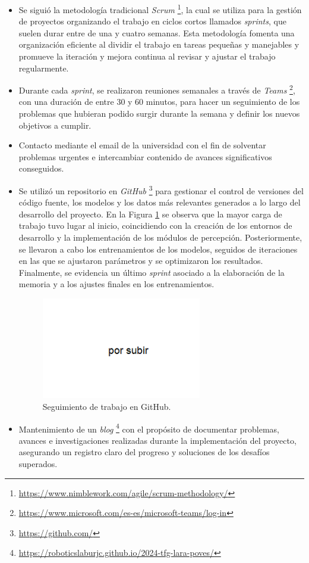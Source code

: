 \begin{itemize}
\item Se siguió la metodología tradicional \textit{Scrum} \footnote{\url{https://www.nimblework.com/agile/scrum-methodology/}}, la cual se utiliza para la gestión de proyectos organizando el trabajo en ciclos cortos llamados \textit{sprints}, que suelen durar entre de una y cuatro semanas. Esta metodología fomenta una organización eficiente al dividir el trabajo en tareas pequeñas y manejables y promueve la iteración y mejora continua al revisar y ajustar el trabajo regularmente.
\item Durante cada \textit{sprint}, se realizaron reuniones semanales a través de \textit{Teams} \footnote{\url{https://www.microsoft.com/es-es/microsoft-teams/log-in}}, con una duración de entre 30 y 60 minutos, para hacer un seguimiento de los problemas que hubieran podido surgir durante la semana y definir los nuevos objetivos a cumplir.
\item Contacto mediante el email de la universidad con el fin de solventar problemas urgentes e intercambiar contenido de avances significativos conseguidos.
\item Se utilizó un repositorio en \textit{GitHub} \footnote{\url{https://github.com/}} para gestionar el control de versiones del código fuente, los modelos y los datos más relevantes generados a lo largo del desarrollo del proyecto. En la Figura \ref{fig:github} se observa que la mayor carga de trabajo tuvo lugar al inicio, coincidiendo con la creación de los entornos de desarrollo y la implementación de los módulos de percepción. Posteriormente, se llevaron a cabo los entrenamientos de los modelos, seguidos de iteraciones en las que se ajustaron parámetros y se optimizaron los resultados. Finalmente, se evidencia un último \textit{sprint} asociado a la elaboración de la memoria y a los ajustes finales en los entrenamientos.

\begin{figure}[ht]
  \centering
  \includegraphics[width=7cm]{figs/objetivos/github.png}
  \caption{Seguimiento de trabajo en GitHub.}
  \label{fig:github}
\end{figure}


\item Mantenimiento de un \textit{blog} \footnote{\url{https://roboticslaburjc.github.io/2024-tfg-lara-poves/}} con el propósito de documentar problemas, avances e investigaciones realizadas durante la implementación del proyecto, asegurando un registro claro del progreso y soluciones de los desafíos superados.


\end{itemize}

